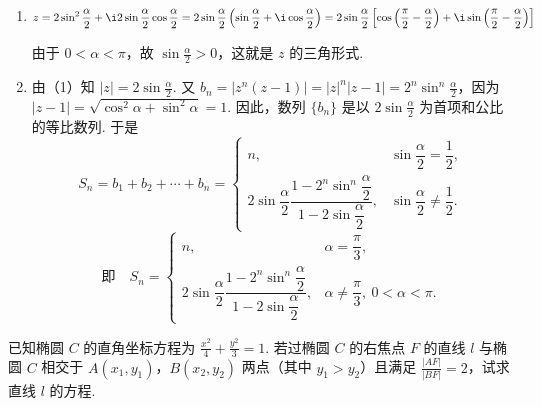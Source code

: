 \begin{solution}
\begin{enumerate}
\item
\[
z=2\sin^2\frac{\alpha}{2}+\i 2\sin\frac{\alpha}{2}\cos\frac{\alpha}{2}=2\sin\frac{\alpha}{2}\left(\sin\frac{\alpha}{2}+\i\cos\frac{\alpha}{2}\right)=2\sin\frac{\alpha}{2}\left[\cos\left(\frac{\pi}{2}-\frac{\alpha}{2}\right)+\i\sin\left(\frac{\pi}{2}-\frac{\alpha}{2}\right)\right]
\]

由于 \(0<\alpha<\pi\)，故 \(\sin\frac{\alpha}{2}>0\)，这就是 \(z\) 的三角形式.

\item 由（1）知 \(|z|=2\sin\frac{\alpha}{2}\). 又 \(b_n=|z^n(z-1)|=|z|^n|z-1|=2^n\sin^n\frac{\alpha}{2}\)，因为 \(|z-1|=\sqrt{\cos^2\alpha+\sin^2\alpha}=1\). 因此，数列 \(\{b_n\}\) 是以 \(2\sin\frac{\alpha}{2}\) 为首项和公比的等比数列. 于是
\[
S_n=b_1+b_2+\cdots+b_n=
\begin{cases}
n, & \sin\dfrac{\alpha}{2}=\dfrac{1}{2},\\[4pt]
2\sin\dfrac{\alpha}{2}\dfrac{1-2^n\sin^n\dfrac{\alpha}{2}}{1-2\sin\dfrac{\alpha}{2}}, & \sin\dfrac{\alpha}{2}\ne\dfrac{1}{2}.
\end{cases}
\]
\[
\text{即}\quad S_n=
\begin{cases}
n, & \alpha=\dfrac{\pi}{3},\\[4pt]
2\sin\dfrac{\alpha}{2}\dfrac{1-2^n\sin^n\dfrac{\alpha}{2}}{1-2\sin\dfrac{\alpha}{2}}, & \alpha\ne\dfrac{\pi}{3},\ 0<\alpha<\pi.
\end{cases}
\]
\end{enumerate}

\end{solution}


\begin{problem}

已知椭圆 \(C\) 的直角坐标方程为 \(\frac{x^2}{4} + \frac{y^2}{3} = 1\). 若过椭圆 \(C\) 的右焦点 \(F\) 的直线 \(l\) 与椭圆 \(C\) 相交于 \(A(x_1, y_1)\)，\(B(x_2, y_2)\) 两点（其中 \(y_1 > y_2\)）且满足 \(\frac{|AF|}{|BF|} = 2\)，试求直线 \(l\) 的方程.
\end{problem}

